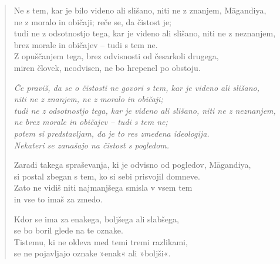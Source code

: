 \clearpage
\begin{verse}

Ne s tem, kar je bilo videno ali slišano, niti ne z znanjem, Māgandiya,\\
ne z moralo in običaji; reče se, da čistost je;\\
tudi ne z odsotnostjo tega, kar je videno ali slišano, niti ne z neznanjem,\\
brez morale in običajev -- tudi s tem ne.\\
Z opuščanjem tega, brez odvisnosti od česarkoli drugega,\\
miren človek, neodvisen, ne bo hrepenel po obstoju.

\emph{Če praviš, da se o čistosti ne govori s tem, kar je videno ali slišano,\\
niti ne z znanjem, ne z moralo in običaji;\\
tudi ne z odsotnostjo tega, kar je videno ali slišano, niti ne z neznanjem,\\
ne brez morale in običajev -- tudi s tem ne;\\
potem si predstavljam, da je to res zmedena ideologija.\\
Nekateri se zanašajo na čistost s pogledom.}

Zaradi takega spraševanja, ki je odvisno od pogledov, Māgandiya,\\
si postal zbegan s tem, ko si sebi prisvojil domneve.\\
Zato ne vidiš niti najmanjšega smisla v vsem tem\\
in vse to imaš za zmedo.

Kdor se ima za enakega, boljšega ali slabšega,\\
se bo boril glede na te oznake.\\
Tistemu, ki ne okleva med temi tremi razlikami,\\
se ne pojavljajo oznake »enak« ali »boljši«.

\end{verse}


